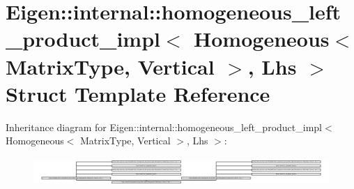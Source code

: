 \hypertarget{struct_eigen_1_1internal_1_1homogeneous__left__product__impl_3_01_homogeneous_3_01_matrix_type_042480d8c61b8193bc4c7039abeeef67a}{}\section{Eigen\+:\+:internal\+:\+:homogeneous\+\_\+left\+\_\+product\+\_\+impl$<$ Homogeneous$<$ Matrix\+Type, Vertical $>$, Lhs $>$ Struct Template Reference}
\label{struct_eigen_1_1internal_1_1homogeneous__left__product__impl_3_01_homogeneous_3_01_matrix_type_042480d8c61b8193bc4c7039abeeef67a}
Inheritance diagram for Eigen\+:\+:internal\+:\+:homogeneous\+\_\+left\+\_\+product\+\_\+impl$<$ Homogeneous$<$ Matrix\+Type, Vertical $>$, Lhs $>$\+:\begin{figure}[H]
\begin{center}
\leavevmode
\includegraphics[height=1.079692cm]{struct_eigen_1_1internal_1_1homogeneous__left__product__impl_3_01_homogeneous_3_01_matrix_type_042480d8c61b8193bc4c7039abeeef67a}
\end{center}
\end{figure}
